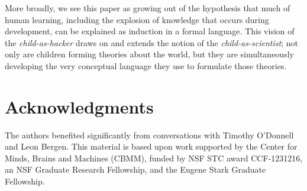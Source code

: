 \documentclass[10pt,letterpaper]{article}
\begin{document}
More broadly, we see this paper as growing out of the hypothesis that
much of human learning, including the explosion of knowledge that
occurs during development, can be explained as induction in a formal
language. This vision of the \emph{child-as-hacker} draws on and
extends the notion of the \emph{child-as-scientist}; not only are
children forming theories about the world, but they are simultaneously
developing the very conceptual language they use to formulate those
theories.


\section{Acknowledgments}

The authors benefited significantly from conversations with Timothy
O'Donnell and Leon Bergen. This material is based upon work supported
by the Center for Minds, Brains and Machines (CBMM), funded by NSF STC
award CCF-1231216, an NSF Graduate Research Fellowship, and the Eugene
Stark Graduate Fellowship.




\setlength{\bibleftmargin}{.125in}
\setlength{\bibindent}{-\bibleftmargin}

\end{document}
